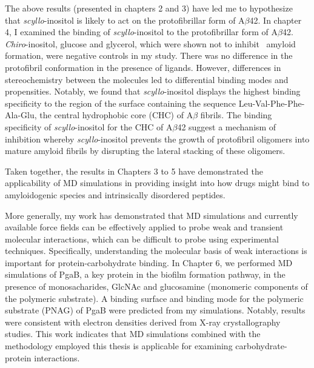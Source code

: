 The above results (presented in chapters 2 and 3) have led me to hypothesize that \textit{scyllo}-inositol is likely to act on the protofibrillar form of A$\beta$42.  In chapter 4, I examined the binding of \textit{scyllo}-inositol to the protofibrillar form of A$\beta$42. \textit{Chiro}-inositol, glucose and glycerol, which were shown not to inhibit \ amyloid formation, were negative controls in my study. There was no difference in the protofibril conformation in the presence of ligands. However, differences in stereochemistry between the molecules led to differential binding modes and propensities. Notably, we found that \textit{scyllo}-inositol displays the highest binding specificity to the region of the surface containing the sequence Leu-Val-Phe-Phe-Ala-Glu, the central hydrophobic core (CHC) of A$\beta$ fibrils.  The binding specificity of \textit{scyllo}-inositol for the CHC of A$\beta$42 suggest a mechanism of inhibition whereby \textit{scyllo}-inositol prevents the growth of protofibril oligomers into mature amyloid fibrils by disrupting the lateral stacking of these oligomers.

Taken together, the results in Chapters 3 to 5 have demonstrated the applicability of MD simulations in providing insight into how drugs might bind to amyloidogenic species and intrinsically disordered peptides. 

More generally, my work has demonstrated that MD simulations and currently available force fields can be effectively applied to probe weak and transient molecular interactions, which can be difficult to probe using experimental techniques. Specifically, understanding the molecular basis of weak interactions is important for protein-carbohydrate binding.\cite{Canchi:2011cg,Fadda:2010p5889}
In Chapter 6, we performed MD simulations of PgaB, a key protein in the biofilm formation pathway, in the presence of monosacharides, GlcNAc and glucosamine (monomeric components of the polymeric substrate). A binding surface and binding mode for the polymeric substrate (PNAG) of PgaB were predicted from my simulations. Notably, results were consistent with electron densities derived from X-ray crystallography studies. This work indicates that MD simulations combined with the methodology employed this thesis is applicable for examining carbohydrate-protein interactions.


